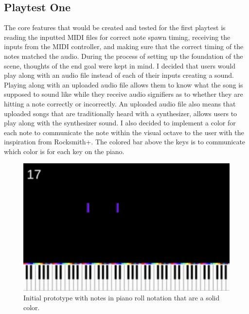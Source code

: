\documentclass[10pt,twocolumn]{article}
\begin{document}
\subsection{Playtest One}

The core features that would be created and tested for the first playtest is reading the inputted MIDI files for correct note spawn timing, receiving the inputs from the MIDI controller, and making sure that the correct timing of the notes matched the audio. During the process of setting up the foundation of the scene, thoughts of the end goal were kept in mind. I decided that users would play along with an audio file instead of each of their inputs creating a sound. Playing along with an uploaded audio file allows them to know what the song is supposed to sound like while they receive audio signifiers as to whether they are hitting a note correctly or incorrectly. An uploaded audio file also means that uploaded songs that are traditionally heard with a synthesizer, allows users to play along with the synthesizer sound. I also decided to implement a color for each note to communicate the note within the visual octave to the user with the inspiration from Rocksmith+. The colored bar above the keys is to communicate which color is for each key on the piano. 

\begin{figure}
    \centering
    \includegraphics[width=.95\linewidth]{pulsekey-proto0.png}
    \caption{
       Initial prototype with notes in piano roll notation that are a solid color.
    }
    \label{fig:first-page}
\end{figure}
\end{document}
